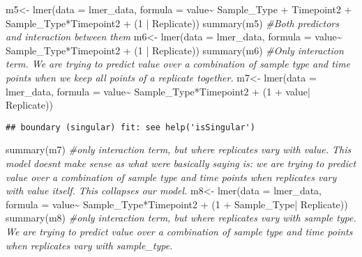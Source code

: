 \documentclass[
]{article}
\newenvironment{Shaded}{\begin{snugshade}}{\end{snugshade}}
\newcommand{\AttributeTok}[1]{\textcolor[rgb]{0.77,0.63,0.00}{#1}}
\newcommand{\CommentTok}[1]{\textcolor[rgb]{0.56,0.35,0.01}{\textit{#1}}}
\newcommand{\DecValTok}[1]{\textcolor[rgb]{0.00,0.00,0.81}{#1}}
\newcommand{\FunctionTok}[1]{\textcolor[rgb]{0.00,0.00,0.00}{#1}}
\newcommand{\NormalTok}[1]{#1}
\newcommand{\OtherTok}[1]{\textcolor[rgb]{0.56,0.35,0.01}{#1}}
\newcommand{\SpecialCharTok}[1]{\textcolor[rgb]{0.00,0.00,0.00}{#1}}
\begin{document}
\begin{Shaded}
\begin{Highlighting}[]
\NormalTok{m5}\OtherTok{\textless{}{-}} \FunctionTok{lmer}\NormalTok{(}\AttributeTok{data =}\NormalTok{ lmer\_data, }\AttributeTok{formula =}\NormalTok{ value}\SpecialCharTok{\textasciitilde{}}\NormalTok{ Sample\_Type }\SpecialCharTok{+}\NormalTok{ Timepoint2 }\SpecialCharTok{+}\NormalTok{ Sample\_Type}\SpecialCharTok{*}\NormalTok{Timepoint2 }\SpecialCharTok{+}\NormalTok{ (}\DecValTok{1} \SpecialCharTok{|}\NormalTok{ Replicate))}
\FunctionTok{summary}\NormalTok{(m5) }\CommentTok{\#Both predictors and interaction between them }
\NormalTok{m6}\OtherTok{\textless{}{-}} \FunctionTok{lmer}\NormalTok{(}\AttributeTok{data =}\NormalTok{ lmer\_data, }\AttributeTok{formula =}\NormalTok{ value}\SpecialCharTok{\textasciitilde{}}\NormalTok{  Sample\_Type}\SpecialCharTok{*}\NormalTok{Timepoint2 }\SpecialCharTok{+}\NormalTok{ (}\DecValTok{1} \SpecialCharTok{|}\NormalTok{ Replicate))}
\FunctionTok{summary}\NormalTok{(m6) }\CommentTok{\#Only interaction term. We are trying to predict value over a combination of sample type and time points when we keep all points of a replicate together.}
\NormalTok{m7}\OtherTok{\textless{}{-}} \FunctionTok{lmer}\NormalTok{(}\AttributeTok{data =}\NormalTok{ lmer\_data, }\AttributeTok{formula =}\NormalTok{ value}\SpecialCharTok{\textasciitilde{}}\NormalTok{  Sample\_Type}\SpecialCharTok{*}\NormalTok{Timepoint2 }\SpecialCharTok{+}\NormalTok{ (}\DecValTok{1} \SpecialCharTok{+}\NormalTok{ value}\SpecialCharTok{|}\NormalTok{ Replicate))}
\end{Highlighting}
\end{Shaded}

\begin{verbatim}
## boundary (singular) fit: see help('isSingular')
\end{verbatim}

\begin{Shaded}
\begin{Highlighting}[]
\FunctionTok{summary}\NormalTok{(m7) }\CommentTok{\#only interaction term, but where replicates vary with value. This model doesn\textquotesingle{}t make sense as what we\textquotesingle{}re basically saying is: we are trying to predict value over a combination of sample type and time points when replicates vary with value itself. This collapses our model.}
\NormalTok{m8}\OtherTok{\textless{}{-}} \FunctionTok{lmer}\NormalTok{(}\AttributeTok{data =}\NormalTok{ lmer\_data, }\AttributeTok{formula =}\NormalTok{ value}\SpecialCharTok{\textasciitilde{}}\NormalTok{  Sample\_Type}\SpecialCharTok{*}\NormalTok{Timepoint2 }\SpecialCharTok{+}\NormalTok{ (}\DecValTok{1} \SpecialCharTok{+}\NormalTok{ Sample\_Type}\SpecialCharTok{|}\NormalTok{ Replicate))}
\FunctionTok{summary}\NormalTok{(m8) }\CommentTok{\#only interaction term, but where replicates vary with sample type. We are trying to predict value over a combination of sample type and time points when replicates vary with sample\_type.}
\end{Highlighting}
\end{Shaded}
\end{document}
